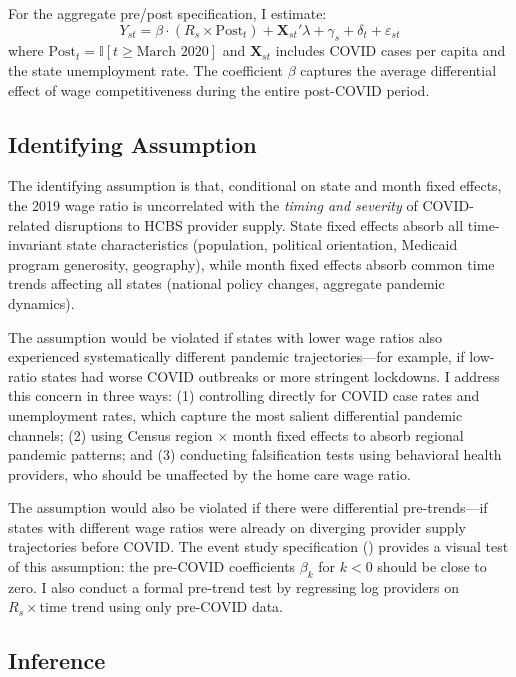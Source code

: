 \documentclass[12pt]{article}
\newcommand{\ind}{\mathbb{I}}
\begin{document}
For the aggregate pre/post specification, I estimate:
\begin{equation}
Y_{st} = \beta \cdot (R_s \times \text{Post}_t) + \mathbf{X}_{st}'\lambda + \gamma_s + \delta_t + \varepsilon_{st}
\label{eq:did}
\end{equation}
where $\text{Post}_t = \ind[t \geq \text{March 2020}]$ and $\mathbf{X}_{st}$ includes COVID cases per capita and the state unemployment rate. The coefficient $\beta$ captures the average differential effect of wage competitiveness during the entire post-COVID period.

\subsection{Identifying Assumption}

The identifying assumption is that, conditional on state and month fixed effects, the 2019 wage ratio is uncorrelated with the \textit{timing and severity} of COVID-related disruptions to HCBS provider supply. State fixed effects absorb all time-invariant state characteristics (population, political orientation, Medicaid program generosity, geography), while month fixed effects absorb common time trends affecting all states (national policy changes, aggregate pandemic dynamics).

The assumption would be violated if states with lower wage ratios also experienced systematically different pandemic trajectories---for example, if low-ratio states had worse COVID outbreaks or more stringent lockdowns. I address this concern in three ways: (1) controlling directly for COVID case rates and unemployment rates, which capture the most salient differential pandemic channels; (2) using Census region $\times$ month fixed effects to absorb regional pandemic patterns; and (3) conducting falsification tests using behavioral health providers, who should be unaffected by the home care wage ratio.

The assumption would also be violated if there were differential pre-trends---if states with different wage ratios were already on diverging provider supply trajectories before COVID. The event study specification () provides a visual test of this assumption: the pre-COVID coefficients $\beta_k$ for $k < 0$ should be close to zero. I also conduct a formal pre-trend test by regressing log providers on $R_s \times \text{time trend}$ using only pre-COVID data.

\subsection{Inference}
\end{document}
